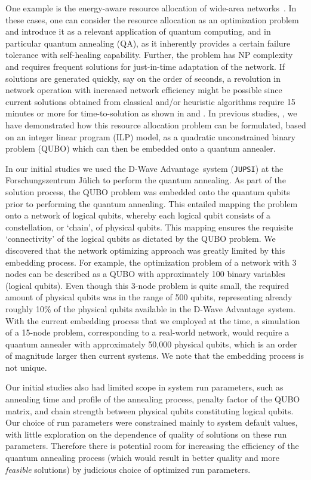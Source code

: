 \documentclass[utf8, nocrop]{FrontiersinHarvardArxiv}
\begin{document}
One example is the energy-aware resource allocation of wide-area networks~\cite{EATE}. In these cases, one can consider the resource allocation as an optimization problem and introduce it as a relevant application of quantum computing, and in particular quantum annealing (QA), as it inherently provides a certain failure tolerance with self-healing capability. Further, the problem has NP complexity and requires frequent solutions for just-in-time adaptation of the network. If solutions are generated quickly, say on the order of seconds, a revolution in network operation with increased network efficiency might be possible since current solutions obtained from classical and/or heuristic algorithms require 15 minutes or more for time-to-solution as shown in \cite{ILPTornatore} and \cite{FellerSA}. In previous studies, \cite{Witt:2022lsx},  we have demonstrated how this resource allocation problem can be formulated, based on an integer linear program (ILP) model, as a quadratic unconstrained binary problem (QUBO) which can then be embedded onto a quantum annealer.

In our initial studies we used the D-Wave Advantage\texttrademark\ system (\texttt{JUPSI}) at the Forschungszentrum J\"ulich to perform the quantum annealing. As part of the solution process, the QUBO problem was embedded onto the quantum qubits prior to performing the quantum annealing.  This entailed mapping the problem onto a network of logical qubits, whereby each logical qubit consists of a constellation, or `chain', of physical qubits.  This mapping ensures the requisite `connectivity' of the logical qubits as dictated by the QUBO problem.   We discovered that the network optimizing approach was greatly limited by this embedding process.  For example, the optimization problem of a network with 3 nodes can be described as a QUBO with approximately 100 binary variables (logical qubits).  Even though this 3-node problem is quite small, the required amount of physical qubits was in the range of 500 qubits, representing already roughly 10\% of the  physical qubits available in the D-Wave Advantage\texttrademark\ system.  With the current embedding process that we employed at the time, a simulation of a 15-node problem, corresponding to a real-world network, would require a quantum annealer with approximately 50,000 physical qubits, which is an order of magnitude larger then current systems.  We note that the embedding process is not unique.

Our initial studies also had limited scope in system run parameters, such as annealing time and profile of the annealing process, penalty factor of the QUBO matrix, and chain strength between physical qubits constituting logical qubits.  Our choice of run parameters were constrained mainly to system default values, with little exploration on the dependence of quality of solutions on these run parameters.  Therefore there is potential room for increasing the efficiency of the quantum annealing process (which would result in better quality and more \emph{feasible} solutions) by judicious choice of optimized run parameters.
\end{document}
